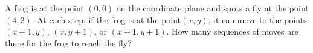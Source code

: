 A frog is at the point $(0, 0)$ on the coordinate plane and spots a fly at the point $(4, 2)$. At each step, if the frog is at the point$ (x, y)$, it can move to the points $(x + 1, y)$, $(x, y + 1)$, or $(x + 1, y + 1)$. How many sequences of moves are there for the frog to reach the fly?
